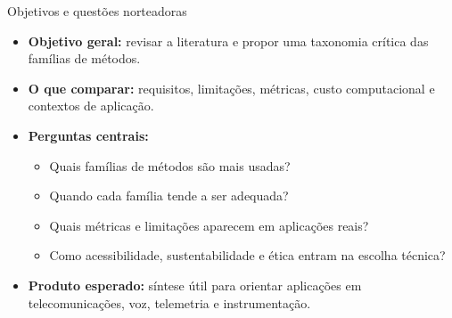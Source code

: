\documentclass[aspectratio=1610,11pt]{beamer}
\begin{document}
\begin{frame}{Objetivos e questões norteadoras}
    \hypertarget{fr-objetivos}{}
    \begin{itemize}
        \item \textbf{Objetivo geral:} revisar a literatura e propor uma taxonomia crítica das famílias de métodos.
        \item \textbf{O que comparar:} requisitos, limitações, métricas, custo computacional e contextos de aplicação.
        \item \textbf{Perguntas centrais:}
        \begin{itemize}
            \item Quais famílias de métodos são mais usadas?
            \item Quando cada família tende a ser adequada?
            \item Quais métricas e limitações aparecem em aplicações reais?
            \item Como acessibilidade, sustentabilidade e ética entram na escolha técnica?
        \end{itemize}
        \item \textbf{Produto esperado:} síntese útil para orientar aplicações em telecomunicações, voz, telemetria e instrumentação.
    \end{itemize}
\end{frame}
\end{document}
